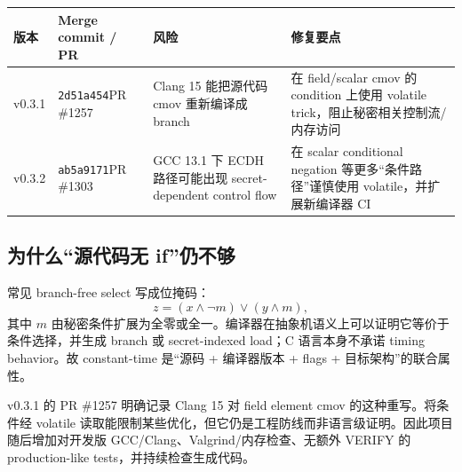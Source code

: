 \documentclass[11pt,a4paper,fontset=none]{ctexart}
\begin{document}
\begingroup
\setlength{\tabcolsep}{3pt}
\begin{longtable}{>{\raggedright\arraybackslash}p{}>{\raggedright\arraybackslash}p{}>{\raggedright\arraybackslash}p{}>{\raggedright\arraybackslash}p{}}
\toprule
版本 & Merge commit / PR & 风险 & 修复要点 \\
\midrule
\endhead
v0.3.1 & \texttt{2d51a454}\newline PR \#1257 & Clang 15 能把源代码 cmov 重新编译成 branch & 在 field/scalar cmov 的 condition 上使用 volatile trick，阻止秘密相关控制流/内存访问 \\
v0.3.2 & \texttt{ab5a9171}\newline PR \#1303 & GCC 13.1 下 ECDH 路径可能出现 secret-dependent control flow & 在 scalar conditional negation 等更多“条件路径”谨慎使用 volatile，并扩展新编译器 CI \\
\bottomrule
\end{longtable}
\endgroup

\subsection{为什么“源代码无 if”仍不够}

常见 branch-free select 写成位掩码：
\[
z=(x\land \neg m)\lor(y\land m),
\]
其中 $m$ 由秘密条件扩展为全零或全一。编译器在抽象机语义上可以证明它等价于条件选择，并生成 branch 或 secret-indexed load；C 语言本身不承诺 timing behavior。故 constant-time 是“源码 + 编译器版本 + flags + 目标架构”的联合属性。

v0.3.1 的 PR \#1257 明确记录 Clang 15 对 field element cmov 的这种重写。将条件经 volatile 读取能限制某些优化，但它仍是工程防线而非语言级证明。因此项目随后增加对开发版 GCC/Clang、Valgrind/内存检查、无额外 VERIFY 的 production-like tests，并持续检查生成代码。
\end{document}
